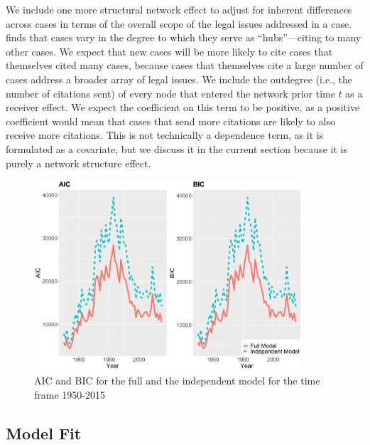 \documentclass{cup-pan}
\begin{document}
We include one more structural network effect to adjust for inherent differences across cases in terms of the overall scope of the legal issues addressed in a case.  \citet{fowler2008authority} finds that cases vary in the degree to which they serve as ``hubs''---citing to many other cases. We expect that new cases will be more likely to cite cases that themselves cited many cases, because cases that themselves cite a large number of cases address a broader array of legal issues. We include the outdegree (i.e., the number of citations sent) of every node that entered the network prior time $t$ as a receiver effect. We expect the coefficient on this term to be positive, as a positive coefficient would mean that cases that send more citations are likely to also receive more citations. This is not technically a dependence term, as it is formulated as a covariate, but we discuss it in the current section because it is purely a network structure effect.







\begin{figure}[bt]
\centering
\includegraphics[width=10cm ]{SCC_AIC_BIC.pdf}
\caption{AIC and BIC for the full and the independent model for the time frame 1950-2015 }
 \label{AIC_BIC}
\end{figure}
 
\subsection{Model Fit}
\end{document}
